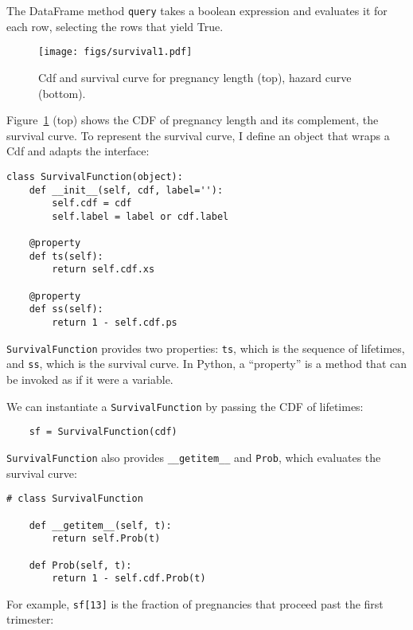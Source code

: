 \documentclass[12pt]{book}
\begin{document}
The DataFrame method {\tt query} takes a boolean expression and
evaluates it for each row, selecting the rows that yield True.

\begin{figure}
\centerline{\texttt{[image: figs/survival1.pdf]}}
\caption{Cdf and survival curve for pregnancy length (top),
hazard curve (bottom).}
\label{survival1}
\end{figure}

Figure~\ref{survival1} (top) shows the CDF of pregnancy length
and its complement, the survival curve.  To represent the
survival curve, I define an object that wraps a Cdf and 
adapts the interface:

\begin{verbatim}
class SurvivalFunction(object):
    def __init__(self, cdf, label=''):
        self.cdf = cdf
        self.label = label or cdf.label

    @property
    def ts(self):
        return self.cdf.xs

    @property
    def ss(self):
        return 1 - self.cdf.ps
\end{verbatim}

{\tt SurvivalFunction} provides two properties: {\tt ts}, which
is the sequence of lifetimes, and {\tt ss}, which is the survival
curve.  In Python, a ``property'' is a method that can be
invoked as if it were a variable.

We can instantiate a {\tt SurvivalFunction} by passing
the CDF of lifetimes:

\begin{verbatim}
    sf = SurvivalFunction(cdf)
\end{verbatim}

{\tt SurvivalFunction} also provides \verb"__getitem__" and
{\tt Prob}, which evaluates the survival curve:

\begin{verbatim}
# class SurvivalFunction

    def __getitem__(self, t):
        return self.Prob(t)

    def Prob(self, t):
        return 1 - self.cdf.Prob(t)
\end{verbatim}

For example, {\tt sf[13]} is the fraction of pregnancies that
proceed past the first trimester:
\end{document}
